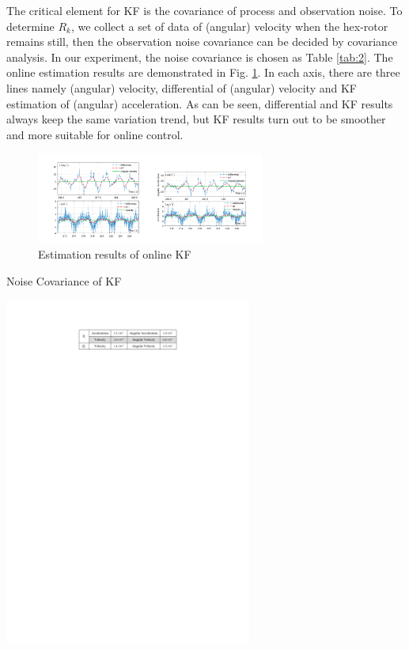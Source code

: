 \documentclass[letterpaper, 10 pt, conference]{ieeeconf}  %
\begin{document}
The critical element for KF is the covariance of process and observation noise.
To determine $R_k$, we collect a set of data of (angular) velocity when the hex-rotor remains still, then the observation noise covariance can be decided by covariance analysis.
In our experiment, the noise covariance is chosen as Table \ref{tab:2}.
The online estimation results are demonstrated in Fig. \ref{f8}.
In each axis, there are three lines namely (angular) velocity, differential of (angular) velocity and KF estimation of (angular) acceleration.
As can be seen, differential and KF results always keep the same variation trend, but KF results turn out to be smoother and more suitable for online control.
\begin{figure}[t]
    \centering
    \includegraphics[width=2.95in]{illustrations/fig8.pdf}
    \caption{Estimation results of online KF}
    \label{f8}
\end{figure}
\begin{table}[t]
    \caption{Noise Covariance of KF}
    \includegraphics[width=3.2in]{illustrations/tab2.pdf}
    \centering
    \label{tab:2}
\end{table}
\end{document}
